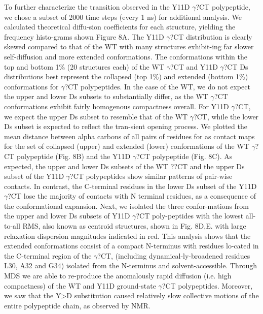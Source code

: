 	To further characterize the transition observed in the Y11D $\gamma$?CT polypeptide, we chose a subset of 2000 time steps (every 1 ns) for additional analysis.  We calculated theoretical diffu-sion coefficients for each structure, yielding the frequency histo-grams  shown Figure 8A. The Y11D $\gamma$?CT distribution is clearly skewed compared to that of the WT with many structures exhibit-ing far slower self-diffusion and more extended conformations. The conformations within the top and bottom 1\% (20 structures each) of the WT $\gamma$?CT and Y11D $\gamma$?CT Ds distributions best represent the collapsed (top 1\%) and extended (bottom 1\%) conformations for $\gamma$?CT polypeptides. In the case of the WT, we do not expect the upper and lower Ds subsets to substantially differ, as the WT $\gamma$?CT conformations exhibit fairly homogenous compactness overall. For Y11D $\gamma$?CT, we expect the upper Ds subset to resemble that of the WT $\gamma$?CT, while the lower Ds subset is expected to reflect the tran-sient opening process. We plotted the mean distance between alpha carbons of all pairs of residues for as contact maps for the set of collapsed (upper) and extended (lower) conformations of the WT $\gamma$?CT polypeptide (Fig. 8B) and the Y11D $\gamma$?CT polypeptide (Fig. 8C).   As expected, the upper and lower Ds subsets of the WT ??CT and the upper Ds subset of the Y11D $\gamma$?CT polypeptides show similar patterns of pair-wise contacts.  In contrast, the C-terminal residues in the lower Ds subset of the Y11D $\gamma$?CT lose the majority of contacts with N terminal residues, as a consequence of the conformational expansion. Next, we isolated the three confor-mations from the upper and lower Ds subsets of  Y11D $\gamma$?CT poly-peptides with the lowest all-to-all RMS, also known as centroid structures, shown in Fig. 8D,E. with large relaxation dispersion magnitudes indicated in red. This analysis shows that the extended conformations consist of a compact N-terminus with residues lo-cated in the C-terminal region of the $\gamma$?CT, (including dynamical-ly-broadened residues L30, A32 and G34) isolated from the N-terminus and solvent-accessible. Through MDS we are able to re-produce the anomalously rapid diffusion (i.e. high compactness) of the WT and Y11D ground-state $\gamma$?CT polypeptides. Moreover, we saw that the Y>D substitution caused relatively slow collective motions of the entire polypeptide chain, as observed by NMR.
 

